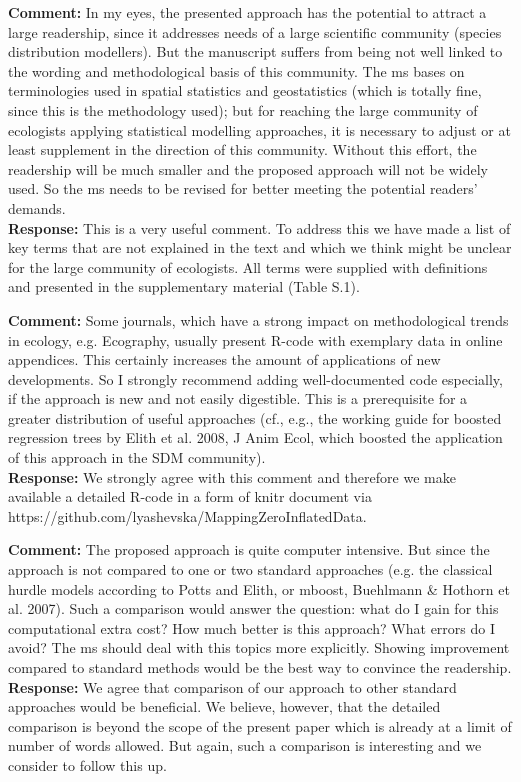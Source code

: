 \documentclass{letter}
\begin{document}
\begin{letter}
\textbf{Comment:} In my eyes, the presented approach has the potential to attract a large readership, since it addresses needs of a large scientific community (species distribution modellers). But the manuscript suffers from being not well linked to the wording and methodological basis of this community. The ms bases on terminologies used in spatial statistics and geostatistics (which is totally fine, since this is the methodology used); but for reaching the large community of ecologists applying statistical modelling approaches, it is necessary to adjust or at least supplement in the direction of this community. Without this effort, the readership will be much smaller and the proposed approach will not be widely used. So the ms needs to be revised for better meeting the potential readers' demands. \\
\textbf{Response:} This is a very useful comment. To address this we have made a list of key terms that are not explained in the text and which we think might be unclear for the large community of ecologists. All terms were supplied with definitions and presented in the supplementary material (Table S.1).

\textbf{Comment:} Some journals, which have a strong impact on methodological trends in ecology, e.g. Ecography, usually present R-code with exemplary data in online appendices. This certainly increases the amount of applications of new developments. So I strongly recommend adding well-documented code especially, if the approach is new and not easily digestible. This is a prerequisite for a greater distribution of useful approaches (cf., e.g., the working guide for boosted regression trees by Elith et al. 2008, J Anim Ecol, which boosted the application of this approach in the SDM community).\\ 
\textbf{Response:} We strongly agree with this  comment and therefore we make available a detailed R-code in a form of knitr document via https://github.com/lyashevska/MappingZeroInflatedData. 

\textbf{Comment:} The proposed approach is quite computer intensive. But since the approach is not compared to one or two standard approaches (e.g. the classical hurdle models according to Potts and Elith, or mboost, Buehlmann \& Hothorn et al. 2007). Such a comparison would answer the question: what do I gain for this computational extra cost? How much better is this approach? What errors do I avoid? The ms should deal with this topics more explicitly. Showing improvement compared to standard methods would be the best way to convince the readership.\\
\textbf{Response:} We agree that comparison of our approach to other standard approaches would be beneficial. 
We believe, however, that the detailed comparison is beyond the scope of the present paper which is already at a limit of number of words allowed. But again, such a comparison is interesting and we consider to follow this up.  


\end{letter}
\end{document}
